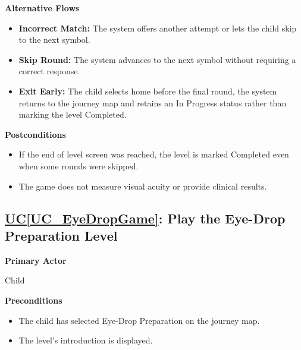 \documentclass[12pt]{article}
\newcounter{ucnum} %
\newcommand{\ucref}[1]{\hyperref[#1]{UC\ref*{#1}}}
\begin{document}
\textbf{Alternative Flows}
\begin{itemize}
    \item \textbf{Incorrect Match:} The system offers another attempt
    or lets the child skip to the next symbol.
    \item \textbf{Skip Round:} The system advances to the next symbol
    without requiring a correct response.
    \item \textbf{Exit Early:} The child selects home before the final
    round, the system returns to the journey map and retains an
    In Progress status rather than marking the level Completed.
\end{itemize}

\textbf{Postconditions}
\begin{itemize}
    \item If the end of level screen was reached, the level is
    marked Completed even when some rounds were skipped.
    \item The game does not measure visual acuity or provide
    clinical results.
\end{itemize}

\label{UC_EyeDropGame}
\subsection{\ucref{UC_EyeDropGame}: Play the Eye-Drop Preparation Level}

\textbf{Primary Actor}

Child

\textbf{Preconditions}
\begin{itemize}
    \item The child has selected Eye-Drop Preparation on the journey map.
    \item The level's introduction is displayed.
\end{itemize}
\end{document}
